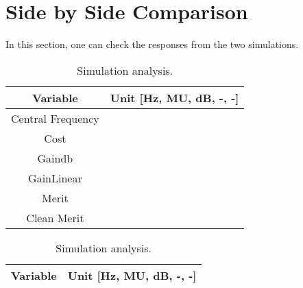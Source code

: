\section{Side by Side Comparison}

In this section, one can check the responses from the two simulations.

\begin{table}[H]
    \begin{minipage}{.5\textwidth}
    \centering
    \vspace{3mm}
    \begin{table}[H]
    \centering
    \begin{tabular}{|c|c|}
    	\hline
        Variable & Unit [Hz, MU, dB, -, -]\\ 
        \hline
        Central Frequency & \\
        \hline
        Cost & \\
        \hline
        Gaindb & \\
        \hline
        GainLinear & \\
        \hline
        Merit & \\
        \hline
        Clean Merit & \\
        \hline
    \end{tabular}
	\end{table}
    \caption{Theoretical analysis.}
    \end{minipage}
    \begin{minipage}{.5\textwidth}
        \begin{table}[H]
    \centering
    \begin{tabular}{|c|c|}
    	\hline
    	Variable & Unit [Hz, MU, dB, -, -]\\ 
    	\hline
         
    \end{tabular}
	\end{table}
	\caption{Simulation analysis.} 
    \end{minipage}
\end{table}


